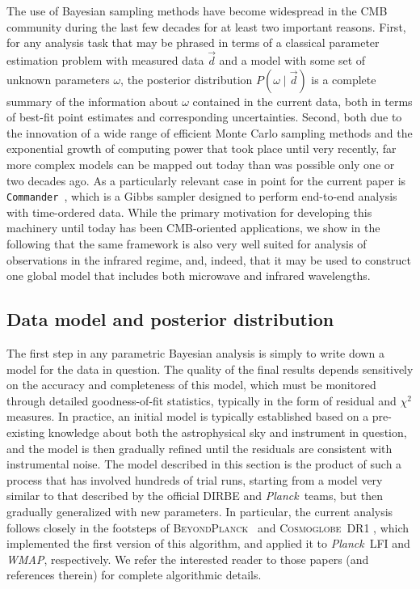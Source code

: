 \documentclass{aa}
\def\commander{\texttt{Commander}}
\def\Planck{\textit{Planck}}
\def\WMAP{\textit{WMAP}}
\newcommand{\dv}[0]{\vec{d}}
\newcommand{\BP}{\textsc{BeyondPlanck}}
\newcommand{\cosmoglobe}{\textsc{Cosmoglobe}}
\begin{document}
The use of Bayesian sampling methods have become widespread in the CMB
community \citep[e.g.,][]{cosmomc,dunkley2009b,handley:2015,planck2014-a12,millea:2019,planck2016-l06,Torrado:2020dgo,bp01,watts2023_dr1} during the last few decades for at least two important
reasons. First, for any analysis task that may be phrased in terms of
a classical parameter estimation problem with measured data $\dv$ and a
model with some set of unknown parameters $\omega$, the posterior
distribution $P(\omega\mid\dv)$ is a complete summary of the
information about $\omega$ contained in the current data, both in
terms of best-fit point estimates and corresponding
uncertainties. Second, both due to the innovation of a wide range of
efficient Monte Carlo sampling methods and the exponential growth of
computing power that took place until very recently, far more complex
models can be mapped out today than was possible only one or two
decades ago. As a particularly relevant case in point for the current
paper is \commander\ \citep{eriksen:2004,seljebotn:2019,bp03}, which is a Gibbs sampler designed to perform
end-to-end analysis with time-ordered data. While the primary
motivation for developing this machinery until today has been
CMB-oriented applications, we show in the following that the same
framework is also very well suited for analysis of observations in the
infrared regime, and, indeed, that it may be used to construct one
global model that includes both microwave and infrared wavelengths.

\subsection{Data model and posterior distribution}
\label{sec:datamodel}

The first step in any parametric Bayesian analysis is simply to write
down a model for the data in question. The quality of the
final results depends sensitively on the accuracy and completeness of
this model, which must be monitored through detailed goodness-of-fit
statistics, typically in the form of residual and $\chi^2$
measures. In practice, an initial model is typically established based
on a pre-existing knowledge about both the astrophysical sky and
instrument in question, and the model is then gradually refined until
the residuals are consistent with instrumental noise. The model
described in this section is the product of such a process
that has involved hundreds of trial runs, starting from a model very
similar to that described by the official DIRBE and \Planck\ teams,
but then gradually generalized with new parameters. In particular, the
current analysis follows closely in the footsteps of
\BP\ \citep{bp01} and \cosmoglobe\ DR1 \citep{watts2023_dr1}, which
implemented the first version of this algorithm, and applied it to
\Planck\ LFI and \WMAP, respectively. We refer the interested reader
to those papers (and references therein) for complete algorithmic
details.
\end{document}
